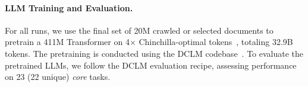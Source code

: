 \paragraph{LLM Training and Evaluation.} 
For all runs, we use the final set of 20M crawled or selected documents to pretrain a 411M Transformer on 4× Chinchilla-optimal tokens~\citep{chinchilla}, totaling 32.9B tokens. 
The pretraining is conducted using the DCLM codebase~\citep{dclm}. 
To evaluate the pretrained LLMs, we follow the DCLM evaluation recipe, assessing performance on 23 (22 unique) \textit{core} tasks. 

